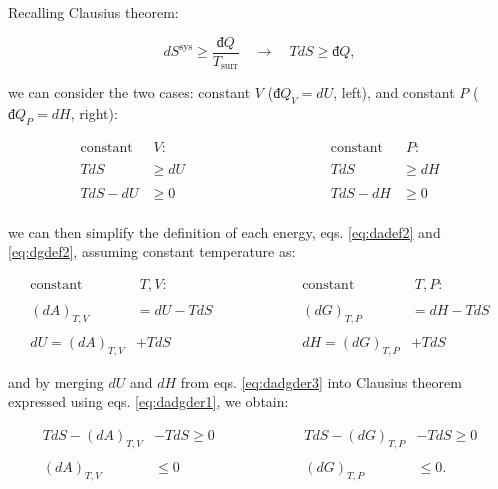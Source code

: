 \documentclass[
  9pt,
]{extbook}
\theoremstyle{definition}
\theoremstyle{definition}
\theoremstyle{definition}
\theoremstyle{definition}
\theoremstyle{remark}
\begin{document}
Recalling Clausius theorem:

\begin{equation}
d S^{\mathrm{sys}} \geq \frac{đQ}{T_{\text{surr}}} \quad \longrightarrow \quad TdS \geq đQ,
\label{eq:dssyscrit}
\end{equation}

we can consider the two cases: constant \(V\) (\(đQ_V=dU\), left), and constant \(P\) (\(đQ_P=dH\), right):

\begin{equation}
\begin{aligned}
\text{constant} & \; V:           & \qquad \qquad & \qquad \qquad &     \text{constant} & \; P: \\
\\
TdS & \geq dU           & &   &     TdS & \geq dH \\
\\
TdS -dU & \geq 0         & &   &      TdS -dH & \geq 0 \\
\end{aligned}
\label{eq:dadgder1}
\end{equation}

we can then simplify the definition of each energy, eqs. \eqref{eq:dadef2} and \eqref{eq:dgdef2}, assuming constant temperature as:

\begin{equation}
\begin{aligned}
\text{constant} & \; T,V:           & \qquad & \qquad &     \text{constant} & \; T,P: \\
\\
(dA)_{T,V} &= dU -TdS     & &   &       (dG)_{T,P} &= dH - TdS \\ 
\\
dU = (dA)_{T,V} &+TdS       & &   &       dH = (dG)_{T,P} &+TdS
\end{aligned}
\label{eq:dadgder3}
\end{equation}

and by merging \(dU\) and \(dH\) from eqs. \eqref{eq:dadgder3} into Clausius theorem expressed using eqs. \eqref{eq:dadgder1}, we obtain:

\begin{equation}
\begin{aligned}
TdS -(dA)_{T,V} &- TdS \geq 0 & \qquad & \qquad & TdS -(dG)_{T,P} &- TdS \geq 0 \\
\\
(dA)_{T,V} & \leq 0 & \qquad & \qquad & (dG)_{T,P} & \leq 0. \\
\end{aligned}
\label{eq:dadgcond}
\end{equation}
\end{document}
